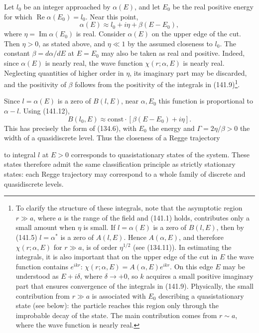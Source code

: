 Let $l_0$ be an integer approached by $\alpha(E)$, and let $E_0$ be the real
positive energy for which $\operatorname{Re}\alpha(E_0)=l_0$. Near this point,
\begin{equation}
 \alpha(E)\approx l_0+i\eta+\beta(E-E_0),
 \tag{141.12}
\end{equation}
where $\eta=\operatorname{Im}\alpha(E_0)$ is real. Consider $\alpha(E)$ on the
upper edge of the cut. Then $\eta>0$, as stated above, and $\eta\ll1$ by the
assumed closeness to $l_0$. The constant $\beta=d\alpha/dE$ at $E=E_0$ may
also be taken as real and positive. Indeed, since $\alpha(E)$ is nearly real,
the wave function $\chi(r;\alpha,E)$ is nearly real. Neglecting quantities of
higher order in $\eta$, its imaginary part may be discarded, and the
positivity of $\beta$ follows from the positivity of the integrals in
(141.9)\footnote{To clarify the structure of these integrals, note that the
asymptotic region $r\gg a$, where $a$ is the range of the field and (141.1)
holds, contributes only a small amount when $\eta$ is small. If
$l=\alpha(E)$ is a zero of $B(l,E)$, then by (141.5)
$l=\alpha^*$ is a zero of $A(l,E)$. Hence $A(\alpha,E)$, and therefore
$\chi(r;\alpha,E)$ for $r\gg a$, is of order $\eta^{1/2}$ (see (134.11)). In
estimating the integrals, it is also important that on the upper edge of the
cut in $E$ the wave function contains $e^{ikr}$:
$\chi(r;\alpha,E)=A(\alpha,E)e^{ikr}$. On this edge $E$ may be understood as
$E+i\delta$, where $\delta\to+0$, so $k$ acquires a small positive imaginary
part that ensures convergence of the integrals in (141.9). Physically, the
small contribution from $r\gg a$ is associated with $E_0$ describing a
quasistationary state (see below): the particle reaches this region only
through the improbable decay of the state. The main contribution comes from
$r\sim a$, where the wave function is nearly real.}.

Since $l=\alpha(E)$ is a zero of $B(l,E)$, near $\alpha,E_0$ this function is
proportional to $\alpha-l$. Using (141.12),
\begin{equation}
 B(l_0,E)\approx\mathrm{const}\cdot[\beta(E-E_0)+i\eta].
 \tag{141.13}
\end{equation}
This has precisely the form of (134.6), with $E_0$ the energy and
$\Gamma=2\eta/\beta>0$ the width of a quasidiscrete level. Thus the closeness
of a Regge trajectory

to integral $l$ at $E>0$ corresponds to quasistationary states of the system.
These states therefore admit the same classification principle as strictly
stationary states: each Regge trajectory may correspond to a whole family of
discrete and quasidiscrete levels.

